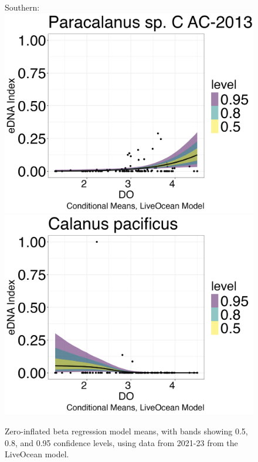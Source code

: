 \documentclass[12pt,twoside]{reedthesis}
\begin{document}
\begin{figure}[h]
\begin{center}
			Southern: \\
			\includegraphics[scale=0.25]{Paracalanus_ZOIB_Means_Mod_noOut}
			\includegraphics[scale=0.25]{Cpacificus_ZOIB_Means_Mod_noOut}
			\caption[Zero-inflated beta regression means (modeled data)]{\footnotesize{Zero-inflated beta regression model means, with bands showing 0.5, 0.8, and 0.95 confidence levels, using data from 2021-23 from the LiveOcean model.}} %
			\label{ModZOIB}
		\end{center}
	\end{figure}
	
\end{document}
